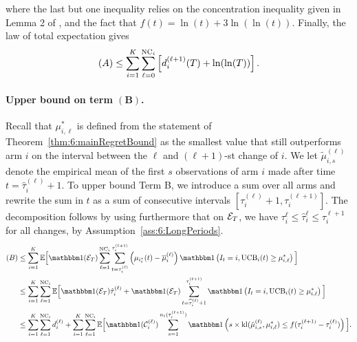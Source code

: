 %
where the last but one inequality relies on the concentration inequality given in Lemma 2 of \cite{KLUCBJournal}, and the fact that $f(t) = \ln(t) + 3 \ln(\ln(t))$. Finally, the law of total expectation gives
\begin{equation}
    (A) \leq \sum_{i=1}^K \sum_{\ell=0}^{\text{NC}_i}\left[d_i^{(\ell+1)}(T) + \ln(\ln(T))\right].
    \label{eq:6:TermAFinal}
\end{equation}

\paragraph{Upper bound on term $\bm{(B)}$.}
%
Recall that $\mu^*_{i,\ell}$ is defined from the statement of Theorem~\ref{thm:6:mainRegretBound} as the smallest value that still outperforms arm $i$ on the interval between the $\ell$ and $(\ell+1)$-st change of $i$. We let $\tilde{\mu}_{i,s}^{(\ell)}$ denote the empirical mean of the first $s$ observations of arm $i$ made after time $t=\hat{\tau}_i^{(\ell)}+1$. To upper bound Term B, we introduce a sum over all arms and rewrite the sum in $t$ as a sum of consecutive intervals $[\tau_i^{(\ell)}+1, \tau_i^{(\ell+1)}]$.
%
The decomposition follows by using furthermore that on $\mathcal{E}_T$, we have $\tau_i^{\ell} \leq \hat \tau_i^ \ell \leq \tau_i^{\ell+1}$ for all changes, by Assumption~\ref{ass:6:LongPeriods}.
%
\begin{align*}
    (B) & \leq \sum_{i=1}^K\bE\Big[\indic(\cE_T)\sum_{\ell=1}^{\NCi} \sum_{t=\tau_i^{(\ell)}}^{\tau_i^{(\ell+1)}}\left(\mu_{i^*_t}(t) - \overline{\mu}_{i}^{(\ell)}\right)\indic\left(I_t = i, \UCB_i(t) \geq \mu^*_{i,\ell}\right)\Big] \\
    & \leq \sum_{i=1}^K\sum_{\ell=1}^{\NCi}\bE\Big[\indic(\cE_T)\hat{\tau}_i^{(\ell)} + \indic(\cE_T) \sum_{t=\widehat{\tau}_i^{(\ell)}+1}^{\tau_i^{(\ell+1)}}\indic\left(I_t = i, \UCB_i(t) \geq \mu^*_{i,\ell}\right)\Big] \\
    & \leq \sum_{i=1}^K\sum_{\ell=1}^{\NCi}d_i^{(\ell)}+ \sum_{i=1}^K\sum_{\ell=1}^{\NCi}\bE\Big[\indic(\cC_i^{(\ell)}) \sum_{s=1}^{n_i(\tau_i^{(\ell+1)})}\indic\left(s \times \kl(\tilde{\mu}_{i,s}^{(\ell)}, \mu^*_{i,\ell}) \leq f(\tau_i^{(\ell+1)} - \tau_i^{(\ell)})\right)\Big].
\end{align*}%
